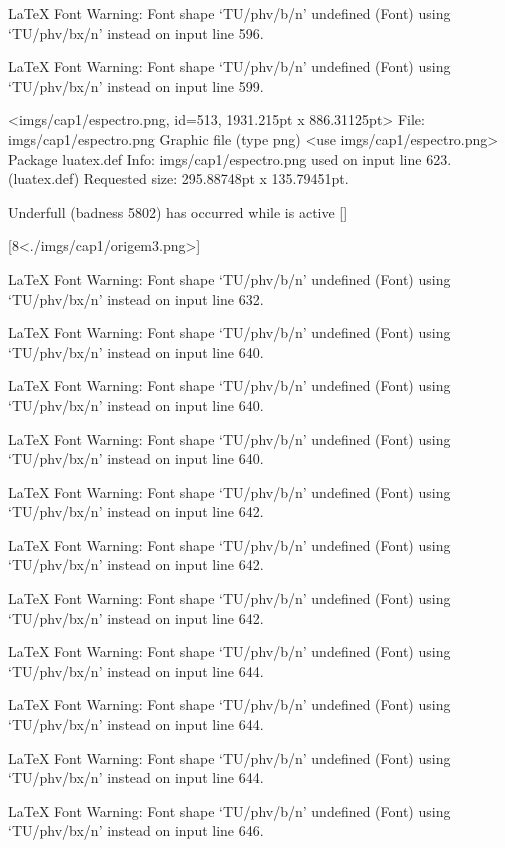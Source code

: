 LaTeX Font Warning: Font shape `TU/phv/b/n' undefined
(Font)              using `TU/phv/bx/n' instead on input line 596.


LaTeX Font Warning: Font shape `TU/phv/b/n' undefined
(Font)              using `TU/phv/bx/n' instead on input line 599.

<imgs/cap1/espectro.png, id=513, 1931.215pt x 886.31125pt>
File: imgs/cap1/espectro.png Graphic file (type png)
<use imgs/cap1/espectro.png>
Package luatex.def Info: imgs/cap1/espectro.png  used on input line 623.
(luatex.def)             Requested size: 295.88748pt x 135.79451pt.

Underfull \vbox (badness 5802) has occurred while \output is active []

[8<./imgs/cap1/origem3.png>]

LaTeX Font Warning: Font shape `TU/phv/b/n' undefined
(Font)              using `TU/phv/bx/n' instead on input line 632.


LaTeX Font Warning: Font shape `TU/phv/b/n' undefined
(Font)              using `TU/phv/bx/n' instead on input line 640.


LaTeX Font Warning: Font shape `TU/phv/b/n' undefined
(Font)              using `TU/phv/bx/n' instead on input line 640.


LaTeX Font Warning: Font shape `TU/phv/b/n' undefined
(Font)              using `TU/phv/bx/n' instead on input line 640.


LaTeX Font Warning: Font shape `TU/phv/b/n' undefined
(Font)              using `TU/phv/bx/n' instead on input line 642.


LaTeX Font Warning: Font shape `TU/phv/b/n' undefined
(Font)              using `TU/phv/bx/n' instead on input line 642.


LaTeX Font Warning: Font shape `TU/phv/b/n' undefined
(Font)              using `TU/phv/bx/n' instead on input line 642.


LaTeX Font Warning: Font shape `TU/phv/b/n' undefined
(Font)              using `TU/phv/bx/n' instead on input line 644.


LaTeX Font Warning: Font shape `TU/phv/b/n' undefined
(Font)              using `TU/phv/bx/n' instead on input line 644.


LaTeX Font Warning: Font shape `TU/phv/b/n' undefined
(Font)              using `TU/phv/bx/n' instead on input line 644.


LaTeX Font Warning: Font shape `TU/phv/b/n' undefined
(Font)              using `TU/phv/bx/n' instead on input line 646.


